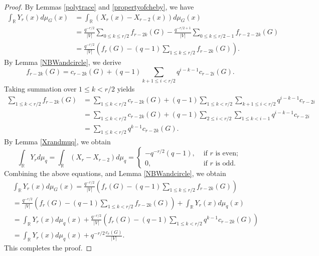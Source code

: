 \documentclass{article}
\begin{document}
\begin{proof}
By Lemmas \ref{polytrace} and \ref{propertyofcheby}, we have
\begin{equation*}\label{eq1}
\begin{aligned}
\int_{\mathbb{R}} Y_{r}(x)d\mu_G(x)&=\int_{\mathbb{R}} (X_{r}(x)-X_{r-2}(x))d\mu_G(x)\\
&=\frac{q^{-r/2}}{|V|}\sum_{0\leq k\leq r/2}f_{r-2k}(G)-\frac{q^{-r/2+1}}{|V|}\sum_{0\leq k\leq r/2-1}f_{r-2-2k}(G)\\
&=\frac{q^{-r/2}}{|V|}\left(f_{r}(G)-(q-1)\sum_{1\leq k\leq r/2}f_{r-2k}(G)\right).
\end{aligned}
\end{equation*}
By Lemma \ref{NBWandcircle}, we derive $$f_{r-2k}(G)=c_{r-2k}(G)+(q-1)\sum_{k+1\leq i<r/2}q^{i-k-1}c_{r-2i}(G).$$
Taking summation over $1\leq k<r/2$ yields
\begin{equation*}\label{eq2}
\begin{aligned}
\sum_{1\leq k< r/2}f_{r-2k}(G)&=\sum_{1\leq k<r/2}c_{r-2k}(G)+(q-1)\sum_{1\leq k<r/2}\sum_{k+1\leq i<r/2}q^{i-k-1}c_{r-2i}\\
&=\sum_{1\leq k<r/2}c_{r-2k}(G)+(q-1)\sum_{2\leq i<r/2}\sum_{1\leq k<i-1}q^{i-k-1}c_{r-2i}\\
&=\sum_{1\leq k<r/2}q^{k-1}c_{r-2k}(G).
\end{aligned}
\end{equation*}
By Lemma \ref{Xrandmuq}, we obtain 
\begin{equation*}\label{eq3}
\int_{\mathbb{R}} Y_r d \mu_q=\int_{\mathbb{R}} (X_{r}-X_{r-2}) d \mu_q=\begin{cases} -q^{-r / 2}(q-1), & \text { if } r \text { is even; } \\ 0, & \text { if } r \text { is odd. }\end{cases}
\end{equation*}
Combining the above equations, and Lemma \ref{NBWandcircle}, we obtain
\begin{equation*}
\begin{aligned}
&\int_{\mathbb{R}} Y_{r}(x)d\mu_G(x)=\frac{q^{-r/2}}{|V|}\left(f_{r}(G)-(q-1)\sum_{1\leq k\leq r/2}f_{r-2k}(G)\right)\\
&=\frac{q^{-r/2}}{|V|}\left(f_{r}(G)-(q-1)\sum_{1\leq k<r/2}f_{r-2k}(G)\right)+\int_{\mathbb{R}}Y_{r}(x)d\mu_{q}(x)\\
&=\int_{\mathbb{R}}Y_{r}(x)d\mu_{q}(x)+\frac{q^{-r/2}}{|V|}\left(f_{r}(G)-(q-1)\sum_{1\leq k<r/2}q^{k-1}c_{r-2k}(G)\right)\\
&=\int_{\mathbb{R}}Y_{r}(x)d\mu_{q}(x)+q^{-r/2}\frac{c_{r}(G)}{|V|}.
\end{aligned}
\end{equation*}
This completes the proof.
\end{proof}
\end{document}
